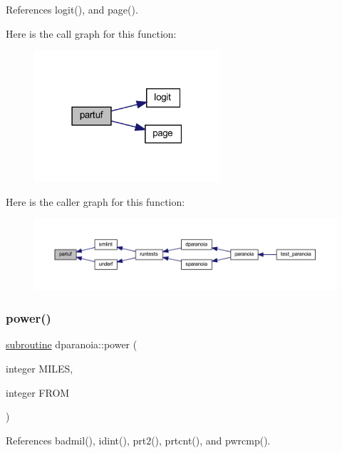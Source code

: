 References logit(), and page().

Here is the call graph for this function\+:
\nopagebreak
\begin{figure}[H]
\begin{center}
\leavevmode
\includegraphics[width=195pt]{dparanoia_8f90_abc9aeab695bb0d80eadb75bba822fee2_cgraph}
\end{center}
\end{figure}
Here is the caller graph for this function\+:
\nopagebreak
\begin{figure}[H]
\begin{center}
\leavevmode
\includegraphics[width=350pt]{dparanoia_8f90_abc9aeab695bb0d80eadb75bba822fee2_icgraph}
\end{center}
\end{figure}
\mbox{\label{dparanoia_8f90_a908ef801c2dc7c4b54f1a43f007a4dc5}} 
\subsubsection{\texorpdfstring{power()}{power()}}
{\footnotesize\ttfamily \hyperlink{M__stopwatch_83_8txt_acfbcff50169d691ff02d4a123ed70482}{subroutine} dparanoia\+::power (\begin{DoxyParamCaption}\item[{integer}]{M\+I\+L\+ES,  }\item[{integer}]{F\+R\+OM }\end{DoxyParamCaption})}



References badmil(), idint(), prt2(), prtcnt(), and pwrcmp().

